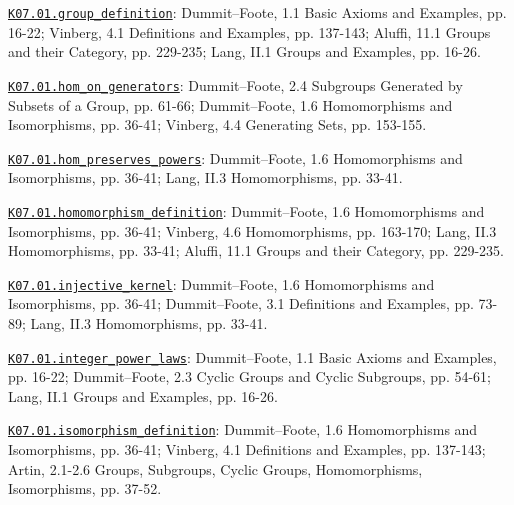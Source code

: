 \par\smallskip\noindent\hypertarget{src:K07.01.group_definition}{}\label{src:K07.01.group_definition}\hyperref[K07.01.group_definition]{\texttt{K07.01.group\_definition}}: Dummit--Foote, 1.1 Basic Axioms and Examples, pp. 16-22; Vinberg, 4.1 Definitions and Examples, pp. 137-143; Aluffi, 11.1 Groups and their Category, pp. 229-235; Lang, II.1 Groups and Examples, pp. 16-26.
\par\smallskip\noindent\hypertarget{src:K07.01.hom_on_generators}{}\label{src:K07.01.hom_on_generators}\hyperref[K07.01.hom_on_generators]{\texttt{K07.01.hom\_on\_generators}}: Dummit--Foote, 2.4 Subgroups Generated by Subsets of a Group, pp. 61-66; Dummit--Foote, 1.6 Homomorphisms and Isomorphisms, pp. 36-41; Vinberg, 4.4 Generating Sets, pp. 153-155.
\par\smallskip\noindent\hypertarget{src:K07.01.hom_preserves_powers}{}\label{src:K07.01.hom_preserves_powers}\hyperref[K07.01.hom_preserves_powers]{\texttt{K07.01.hom\_preserves\_powers}}: Dummit--Foote, 1.6 Homomorphisms and Isomorphisms, pp. 36-41; Lang, II.3 Homomorphisms, pp. 33-41.
\par\smallskip\noindent\hypertarget{src:K07.01.homomorphism_definition}{}\label{src:K07.01.homomorphism_definition}\hyperref[K07.01.homomorphism_definition]{\texttt{K07.01.homomorphism\_definition}}: Dummit--Foote, 1.6 Homomorphisms and Isomorphisms, pp. 36-41; Vinberg, 4.6 Homomorphisms, pp. 163-170; Lang, II.3 Homomorphisms, pp. 33-41; Aluffi, 11.1 Groups and their Category, pp. 229-235.
\par\smallskip\noindent\hypertarget{src:K07.01.injective_kernel}{}\label{src:K07.01.injective_kernel}\hyperref[K07.01.injective_kernel]{\texttt{K07.01.injective\_kernel}}: Dummit--Foote, 1.6 Homomorphisms and Isomorphisms, pp. 36-41; Dummit--Foote, 3.1 Definitions and Examples, pp. 73-89; Lang, II.3 Homomorphisms, pp. 33-41.
\par\smallskip\noindent\hypertarget{src:K07.01.integer_power_laws}{}\label{src:K07.01.integer_power_laws}\hyperref[K07.01.integer_power_laws]{\texttt{K07.01.integer\_power\_laws}}: Dummit--Foote, 1.1 Basic Axioms and Examples, pp. 16-22; Dummit--Foote, 2.3 Cyclic Groups and Cyclic Subgroups, pp. 54-61; Lang, II.1 Groups and Examples, pp. 16-26.
\par\smallskip\noindent\hypertarget{src:K07.01.isomorphism_definition}{}\label{src:K07.01.isomorphism_definition}\hyperref[K07.01.isomorphism_definition]{\texttt{K07.01.isomorphism\_definition}}: Dummit--Foote, 1.6 Homomorphisms and Isomorphisms, pp. 36-41; Vinberg, 4.1 Definitions and Examples, pp. 137-143; Artin, 2.1-2.6 Groups, Subgroups, Cyclic Groups, Homomorphisms, Isomorphisms, pp. 37-52.

